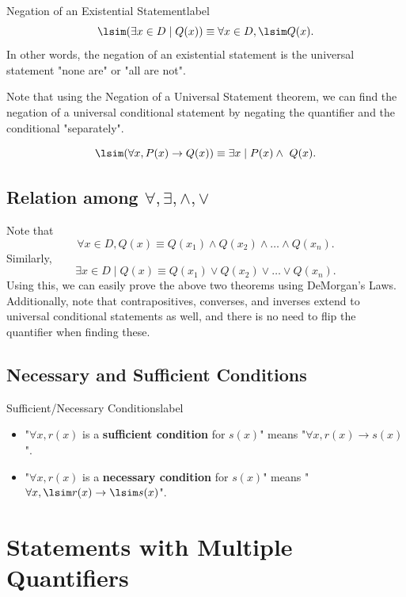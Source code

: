 \documentclass[a4paper]{report}
\begin{document}
\begin{theorem}{Negation of an Existential Statement}{label}
    \[
        \lsim (\exists x \in D  \mid Q(x)) \equiv \forall x \in D, \lsim Q(x)
    .\] 
    In other words, the negation of an existential statement is the universal statement "none are" or "all are not".
\end{theorem}

Note that using the Negation of a Universal Statement theorem, we can find the negation of a universal conditional statement by
negating the quantifier and the conditional "separately".

\[
    \lsim (\forall x, P(x) \to Q(x)) \equiv \exists x  \mid P(x) \land ~Q(x)
.\] 

\subsection{Relation among $\forall ,\exists ,\land, \lor$}

Note that \[
    \forall x \in D, Q(x) \equiv Q(x_1) \land Q(x_2) \land \ldots \land Q(x_n)
.\] 
Similarly, \[
    \exists x \in D  \mid Q(x) \equiv Q(x_1) \lor Q(x_2) \lor \ldots \lor Q(x_n)
.\] 
Using this, we can easily prove the above two theorems using DeMorgan's Laws.
Additionally, note that contrapositives, converses, and inverses extend to universal conditional statements as well, and there is no need
to flip the quantifier when finding these.

\subsection{Necessary and Sufficient Conditions}

\begin{definition}{Sufficient/Necessary Conditions}{label}
    \begin{itemize}
        \item "$\forall x, r(x)$ is a \textbf{sufficient condition} for $s(x)$" means "$\forall x, r(x) \to s(x)$".
        \item "$\forall x, r(x)$ is a \textbf{necessary condition} for $s(x)$" means "$\forall x, \lsim r(x) \to \lsim s(x)$".
    \end{itemize}
\end{definition}

\section{Statements with Multiple Quantifiers}
\end{document}
